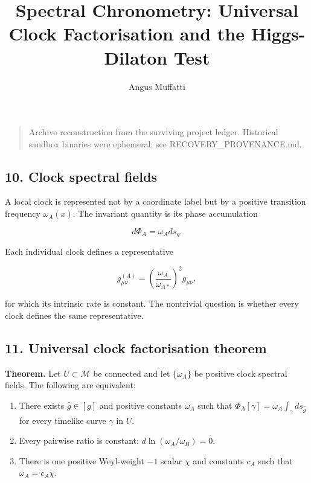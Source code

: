 \documentclass[
]{article}
\title{Spectral Chronometry: Universal Clock Factorisation and the
Higgs-Dilaton Test}
\author{Angus Muffatti}
\date{}
\providecommand{\tightlist}{%
  \setlength{\itemsep}{0pt}\setlength{\parskip}{0pt}}
\begin{document}
\maketitle

\begin{quote}
Archive reconstruction from the surviving project ledger. Historical
sandbox binaries were ephemeral; see RECOVERY\_PROVENANCE.md.
\end{quote}

\hypertarget{clock-spectral-fields}{%
\subsection{10. Clock spectral fields}\label{clock-spectral-fields}}

A local clock is represented not by a coordinate label but by a positive
transition frequency \(\omega_A(x)\). The invariant quantity is its
phase accumulation

\[
d\Phi_A=\omega_A ds_g.
\]

Each individual clock defines a representative

\[
g^{(A)}_{\mu\nu}
=\left(\frac{\omega_A}{\omega_{A*}}\right)^2g_{\mu\nu},
\]

for which its intrinsic rate is constant. The nontrivial question is
whether every clock defines the same representative.

\hypertarget{universal-clock-factorisation-theorem}{%
\subsection{11. Universal clock factorisation
theorem}\label{universal-clock-factorisation-theorem}}

\textbf{Theorem.} Let \(U\subset\mathcal M\) be connected and let
\(\{\omega_A\}\) be positive clock spectral fields. The following are
equivalent:

\begin{enumerate}
\def\labelenumi{\arabic{enumi}.}
\tightlist
\item
  There exists \(\widehat g\in[g]\) and positive constants
  \(\bar\omega_A\) such that
  \(\Phi_A[\gamma]=\bar\omega_A\int_\gamma ds_{\widehat g}\) for every
  timelike curve \(\gamma\) in \(U\).
\item
  Every pairwise ratio is constant: \(d\ln(\omega_A/\omega_B)=0\).
\item
  There is one positive Weyl-weight \(-1\) scalar \(\chi\) and constants
  \(c_A\) such that \(\omega_A=c_A\chi\).
\end{enumerate}
\end{document}
